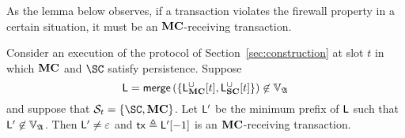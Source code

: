 As the lemma below observes, if a transaction violates the firewall property in
a certain situation, it must be an $\mathbf{MC}$-receiving transaction.






\begin{lemma}\label{lem:firewall-tx-types}
  Consider an execution of the protocol of Section~\ref{sec:construction} at
  slot $t$ in
  which $\mathbf{MC}$ and $\SC$ satisfy persistence.
  Suppose
  $$
    \mathsf{L} =
    \mathsf{merge}\left(
        \{\mathsf{L}_{\mathbf{MC}}^{\cup}[t], \mathsf{L}_{\mathbf{SC}}^{\cup}[t]\}
    \right)
    \not\in
    \mathbb{V}_{\mathfrak{A}}
  $$
  and suppose that $\Secure_t = \{\SC, \MC\}$.
  Let $\mathsf{L}'$ be the minimum prefix of $\mathsf{L}$ such that
  $\mathsf{L}' \not\in \mathbb{V}_{\mathfrak{A}}$. Then
  $\mathsf{L}'\neq\varepsilon$ and
  $\mathsf{tx} \triangleq \mathsf{L}'[-1]$
  is an $\mathbf{MC}$-receiving transaction.
\end{lemma}

